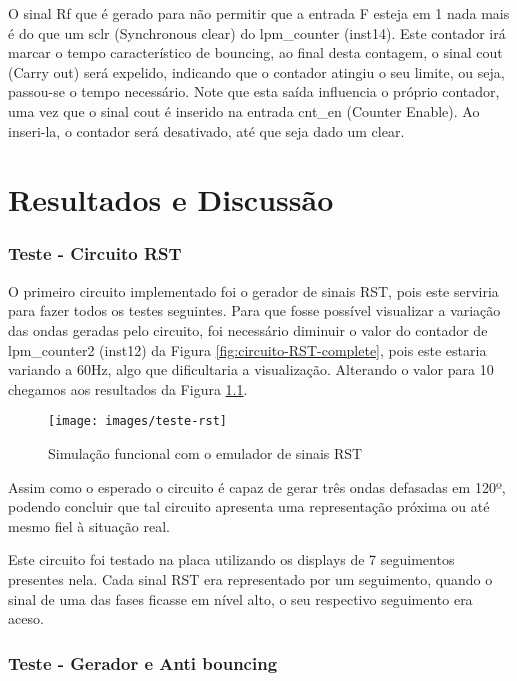 \documentclass[12pt,a4paper,openany]{abntex2}
\begin{document}
O sinal Rf que é gerado para não permitir que a entrada F esteja em 1 nada mais é do que um sclr (Synchronous clear) do lpm\_counter (inst14). Este contador irá marcar o tempo característico de bouncing, ao final desta contagem, o sinal cout (Carry out) será expelido, indicando que o contador atingiu o seu limite, ou seja, passou-se o tempo necessário. Note que esta saída influencia o próprio contador, uma vez que o sinal cout é inserido na entrada cnt\_en (Counter Enable). Ao inseri-la, o contador será desativado, até que seja dado um clear.

\chapter{Resultados e Discussão}

\subsection{Teste - Circuito RST}

O primeiro circuito implementado foi o gerador de sinais RST, pois este serviria para fazer todos os testes seguintes. Para que fosse possível visualizar a variação das ondas geradas pelo circuito, foi necessário diminuir o valor do contador de lpm\_counter2 (inst12) da Figura \ref{fig:circuito-RST-complete}, pois este estaria variando a 60Hz, algo que dificultaria a visualização. Alterando o valor para 10 chegamos aos resultados da Figura \ref{fig:teste-rst}.

\begin{figure}[!htp]
	\centering
	\caption{Simulação funcional com o emulador de sinais RST}
	\texttt{[image: images/teste-rst]}	\label{fig:teste-rst}
\end{figure}

Assim como o esperado o circuito é capaz de gerar três ondas defasadas em 120º, podendo concluir que tal circuito apresenta uma representação próxima ou até mesmo fiel à situação real.

Este circuito foi testado na placa utilizando os displays de 7 seguimentos presentes nela. Cada sinal RST era representado por um seguimento, quando o sinal de uma das fases ficasse em nível alto, o seu respectivo seguimento era aceso. 

\subsection{Teste - Gerador e Anti bouncing}
\end{document}
